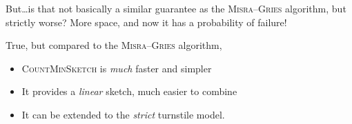 But\dots is that not basically a similar guarantee as the \textsc{Misra--Gries} algorithm, but strictly worse? More space, and now it has a probability of failure!\smallskip

\begin{framed}
\noindent True, but compared to the \textsc{Misra--Gries} algorithm,
\begin{itemize}
    \item \textsc{CountMinSketch} is \emph{much} faster and simpler
    \item It provides a \emph{linear} sketch, much easier to combine
    \item It can be extended to the \emph{strict} turnstile model.
\end{itemize}
\end{framed}

